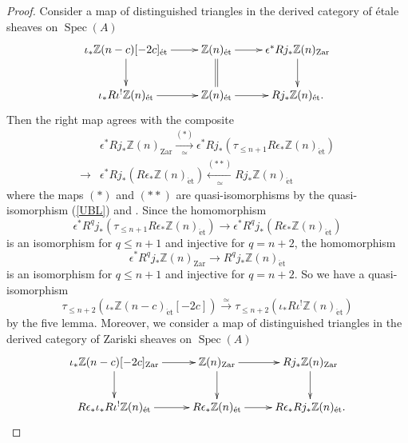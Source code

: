 \documentclass{article}
\newcommand{\spec}{\operatorname{Spec}}
\newcommand{\et}{\mathrm{\acute{e}t}}
\newcommand{\Zar}{\mathrm{Zar}}
\begin{document}
\begin{proof}
Consider a map of distinguished triangles in the derived category of \'{e}tale
sheaves on $\spec(A)$
%
\begin{equation}\label{mpdis}
\xymatrix{
\iota_{*}\mathbb{Z}(n-c)[-2c]_{\et} 
\ar[r]\ar[d]
&
\mathbb{Z}(n)_{\et}
\ar[r]\ar@{=}[d]
&
\epsilon^{*}Rj_{*}\mathbb{Z}(n)_{\Zar}
\ar[d]
\\
\iota_{*}R\iota^{!}\mathbb{Z}(n)_{\et}
\ar[r]
&
\mathbb{Z}(n)_{\et}
\ar[r]
&
Rj_{*}\mathbb{Z}(n)_{\et}.
}
\end{equation}
%
Then the right map
agrees with the composite
%
\begin{align*}
&\epsilon^{*}Rj_{*}\mathbb{Z}(n)_{\Zar}
\xrightarrow[\simeq]{(*)}
\epsilon^{*}Rj_{*}\left(
\tau_{\leq n+1}R\epsilon_{*}\mathbb{Z}(n)_{\et}
\right)  \\
\to
& \epsilon^{*}Rj_{*}\left(
R\epsilon_{*}\mathbb{Z}(n)_{\et}
\right)
\xleftarrow[\simeq]{(**)}
Rj_{*}\mathbb{Z}(n)_{\et}
\end{align*}
%
where the maps $(*)$ and $(**)$ are quasi-isomorphisms 
by the quasi-isomorphism (\ref{UBL}) and \cite[p.776, Proposition 2.2. a)]{Ge}. 
Since the homomorphism
%
\begin{equation*}
\epsilon^{*}R^{q}j_{*}\left(
\tau_{\leq n+1}R\epsilon_{*}\mathbb{Z}(n)_{\et}
\right)
\to
\epsilon^{*}R^{q}j_{*}\left(
R\epsilon_{*}
\mathbb{Z}(n)_{\et}
\right)
\end{equation*}
%
is an isomorphism for $q\leq n+1$
and injective for $q=n+2$,
the homomorphism
%
\begin{equation*}
\epsilon^{*}R^{q}j_{*}\mathbb{Z}(n)_{\Zar}
\to
R^{q}j_{*}\mathbb{Z}(n)_{\et}
\end{equation*}
%
is an isomorphism for $q\leq n+1$ and
injective for $q=n+2$. So we have a quasi-isomorphism
%
\begin{equation}\label{Gyset}
\tau_{\leq n+2}\left(
\iota_{*}\mathbb{Z}(n-c)_{\et}[-2c]
\right)
\xrightarrow{\simeq}
\tau_{\leq n+2}\left(
\iota_{*}R\iota^{!}\mathbb{Z}(n)_{\et}
\right)
\end{equation}
%
by the five lemma. Moreover, we consider
a map of distinguished triangles in the derived category of Zariski
sheaves on $\spec(A)$
%
\begin{equation*}
\xymatrix{
\iota_{*}\mathbb{Z}(n-c)[-2c]_{\Zar}
\ar[r]\ar[d]
&
\mathbb{Z}(n)_{\Zar}
\ar[r]\ar[d]
&
Rj_{*}\mathbb{Z}(n)_{\Zar}
\ar[d]
\\
R\epsilon_{*}\iota_{*}R\iota^{!}\mathbb{Z}(n)_{\et}
\ar[r]
&
R\epsilon_{*}\mathbb{Z}(n)_{\et}
\ar[r]
&
R\epsilon_{*}Rj_{*}\mathbb{Z}(n)_{\et}.
}    

\end{equation*}
\end{proof}
\end{document}
